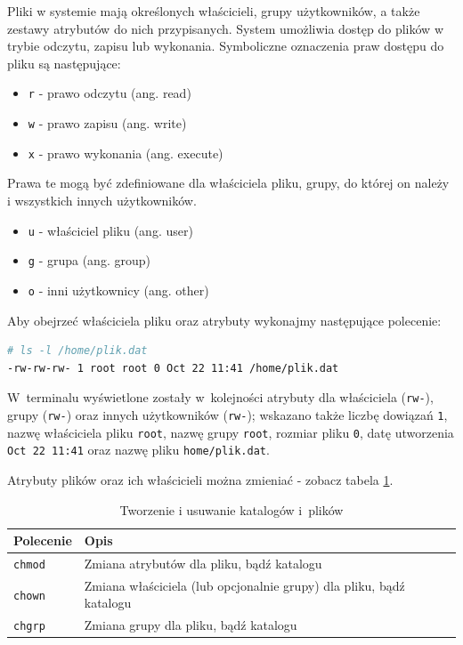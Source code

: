 \documentclass[11pt,twoside,a4paper]{article}
\newenvironment{myitemize}
{ \begin{itemize}
    \setlength{\itemsep}{0pt}
    \setlength{\parskip}{0pt}
    \setlength{\parsep}{0pt}     }
{ \end{itemize}                  }
\begin{document}
\begin{example}

Pliki w systemie mają określonych właścicieli, grupy użytkowników, a także zestawy atrybutów do nich przypisanych. System umożliwia dostęp do plików w trybie odczytu, zapisu lub wykonania. Symboliczne oznaczenia praw dostępu do pliku są następujące:

\begin{myitemize}
\item \lstinline{r} - prawo odczytu (ang. read)
\item \lstinline{w} - prawo zapisu (ang. write)
\item \lstinline{x} - prawo wykonania (ang. execute)
\end{myitemize}

Prawa te mogą być zdefiniowane dla właściciela pliku, grupy, do której on należy i wszystkich innych użytkowników.

\begin{myitemize}
\item \lstinline{u} - właściciel pliku (ang. user)
\item \lstinline{g} - grupa (ang. group)
\item \lstinline{o} - inni użytkownicy (ang. other)
\end{myitemize}

Aby obejrzeć właściciela pliku oraz atrybuty wykonajmy następujące polecenie:

\begin{lstlisting}[language=bash]
# ls -l /home/plik.dat
-rw-rw-rw- 1 root root 0 Oct 22 11:41 /home/plik.dat
\end{lstlisting}

W~terminalu wyświetlone zostały w~kolejności atrybuty dla właściciela (\lstinline{rw-}), grupy (\lstinline{rw-}) oraz innych użytkowników (\lstinline{rw-}); wskazano także liczbę dowiązań \lstinline{1}, nazwę właściciela pliku \lstinline{root}, nazwę grupy \lstinline{root}, rozmiar pliku \lstinline{0}, datę utworzenia \lstinline{Oct 22 11:41} oraz nazwę pliku \lstinline{home/plik.dat}. 


Atrybuty plików oraz ich właścicieli można zmieniać - zobacz tabela \ref{tab:zmien}. 

\begin{table}[h!]
\centering
\caption{Tworzenie i usuwanie katalogów i~plików}
\setlength{\arrayrulewidth}{1pt}
\setlength{\tabcolsep}{6pt}
\renewcommand{\arraystretch}{1.2}
\begin{tabular}{ |p{}|p{}|}
\hline \rowcolor{gray}
\textbf{Polecenie} & \textbf{Opis} \\ \hline
\mbox{\lstinline{chmod}} & Zmiana atrybutów dla pliku, bądź katalogu \\ \hline 
\mbox{\lstinline{chown}} & Zmiana właściciela (lub opcjonalnie grupy) dla pliku, bądź katalogu \\ \hline 
\mbox{\lstinline{chgrp}}  & Zmiana grupy dla pliku, bądź katalogu \\ \hline
\end{tabular}
\label{tab:zmien}
\end{table}


\end{example}
\end{document}
